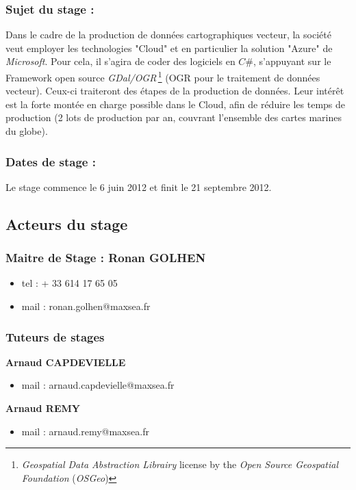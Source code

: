 \subsubsection*{Sujet du stage :}
Dans le cadre de la production de données cartographiques vecteur, la
société \maxsea veut employer les technologies "Cloud" et en
particulier la solution "Azure" de \textit{Microsoft}. Pour cela, il
s’agira de coder des logiciels en $C\#$, s’appuyant sur le Framework
open source \textit{GDal/OGR}\,\footnote{\textit{Geospatial Data
    Abstraction Librairy} license by the \textit{Open Source
    Geospatial Foundation} (\textit{OSGeo})} (OGR pour le traitement
de données vecteur). Ceux-ci traiteront des étapes de la production de
données. Leur intérêt est la forte montée en charge possible dans le
Cloud, afin de réduire les temps de production (2 lots de production
par an, couvrant l’ensemble des cartes marines du globe).

\subsubsection*{Dates de stage :}
Le stage commence le 6 juin 2012 et finit le 21 septembre 2012.

\subsection{Acteurs du stage}
\subsubsection*{Maitre de Stage : Ronan GOLHEN}
\begin{itemize}
\item tel : + 33 614 17 65 05
\item mail : ronan.golhen@maxsea.fr
\end{itemize}


\subsubsection*{Tuteurs de stages}
\textbf{Arnaud CAPDEVIELLE}
\begin{itemize}
\item mail : arnaud.capdevielle@maxsea.fr 
\end{itemize}


\textbf{Arnaud REMY}
\begin{itemize}
\item mail : arnaud.remy@maxsea.fr
\end{itemize}



